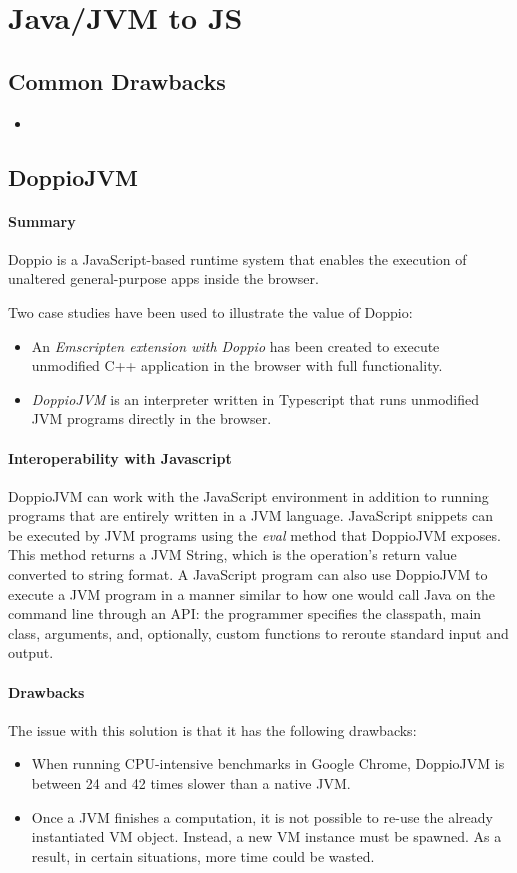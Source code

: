 \section{Java/JVM to JS}
\label{sec:java-jvm-to-js}
\subsection{Common Drawbacks}
\label{ssec:common-drawbacks}
\begin{itemize}
\item
\end{itemize}

\subsection{DoppioJVM}
\label{ssec:doppiojvm}

\paragraph{Summary}
Doppio is a JavaScript-based runtime system that enables the execution of unaltered general-purpose apps inside the browser.

Two case studies have been used to illustrate the value of Doppio:
\begin{itemize}
	\item An \emph{Emscripten extension with Doppio} has been created to execute unmodified C++ application in the browser with full functionality.
	\item \emph{DoppioJVM} is an interpreter written in Typescript that runs unmodified JVM programs directly in the browser.
\end{itemize}

\paragraph{Interoperability with Javascript}
DoppioJVM can work with the JavaScript environment in addition to running programs that are entirely written in a JVM language. JavaScript snippets can be executed by JVM programs using the \textit{eval} method that DoppioJVM exposes. This method returns a JVM String, which is the operation's return value converted to string format. A JavaScript program can also use DoppioJVM to execute a JVM program in a manner similar to how one would call Java on the command line through an API: the programmer specifies the classpath, main class, arguments, and, optionally, custom functions to reroute standard input and output.
\paragraph{Drawbacks}
The issue with this solution is that it has the following drawbacks:
\begin{itemize}
	\item When running CPU-intensive benchmarks in Google Chrome, DoppioJVM is between 24 and 42 times slower than a native JVM.
	\item Once a JVM finishes a computation, it is not possible to re-use the already instantiated VM object. Instead, a new VM instance must be spawned. As a result, in certain situations, more time could be wasted.
\end{itemize}
